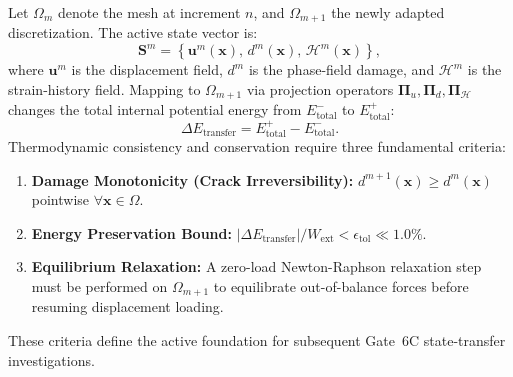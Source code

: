 Let $\Omega_m$ denote the mesh at increment $n$, and $\Omega_{m+1}$ the newly adapted discretization. The active state vector is:
\begin{equation}
  \mathbf{S}^m = \left\{ \mathbf{u}^m(\mathbf{x}),\, d^m(\mathbf{x}),\, \mathcal{H}^m(\mathbf{x}) \right\},
  \label{eq:state_vector_ch3}
\end{equation}
where $\mathbf{u}^m$ is the displacement field, $d^m$ is the phase-field damage, and $\mathcal{H}^m$ is the strain-history field. Mapping to $\Omega_{m+1}$ via projection operators $\mathbf{\Pi}_u, \mathbf{\Pi}_d, \mathbf{\Pi}_{\mathcal{H}}$ changes the total internal potential energy from $E_{\mathrm{total}}^-$ to $E_{\mathrm{total}}^+$:
\begin{equation}
  \Delta E_{\mathrm{transfer}} = E_{\mathrm{total}}^+ - E_{\mathrm{total}}^-.
  \label{eq:delta_e_transfer_ch3}
\end{equation}
Thermodynamic consistency and conservation require three fundamental criteria:
\begin{enumerate}
  \item \textbf{Damage Monotonicity (Crack Irreversibility):} $d^{m+1}(\mathbf{x}) \ge d^m(\mathbf{x})$ pointwise $\forall \mathbf{x} \in \Omega$.
  \item \textbf{Energy Preservation Bound:} $|\Delta E_{\mathrm{transfer}}| / W_{\mathrm{ext}} < \epsilon_{\mathrm{tol}} \ll 1.0\%$.
  \item \textbf{Equilibrium Relaxation:} A zero-load Newton-Raphson relaxation step must be performed on $\Omega_{m+1}$ to equilibrate out-of-balance forces before resuming displacement loading.
\end{enumerate}
These criteria define the active foundation for subsequent Gate~6C state-transfer investigations.
